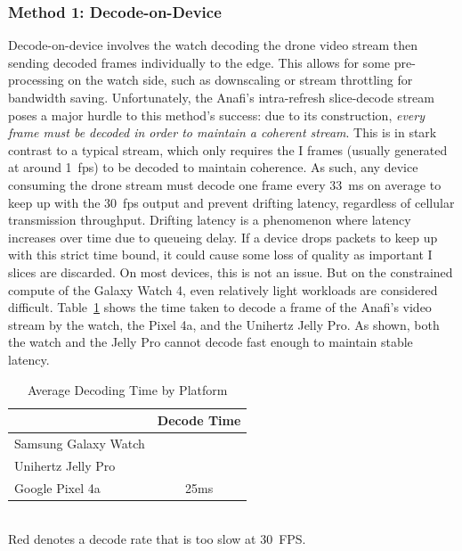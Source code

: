\subsubsection{Method 1: Decode-on-Device}
\label{sec:method-1}
Decode-on-device involves the watch decoding the drone video stream then sending decoded frames individually to the edge. This allows for some pre-processing on the watch side, such as downscaling or stream throttling for bandwidth saving. Unfortunately, the Anafi's intra-refresh slice-decode stream poses a major hurdle to this method's success: due to its construction, \textit{every frame must be decoded in order to maintain a coherent stream}. This is in stark contrast to a typical stream, which only requires the I frames (usually generated at around 1~fps) to be decoded to maintain coherence. As such, any device consuming the drone stream must decode one frame every 33~ms on average to keep up with the 30~fps output and prevent drifting latency, regardless of cellular transmission throughput. Drifting latency is a phenomenon where latency increases over time due to queueing delay. If a device drops packets to keep up with this strict time bound, it could cause some loss of quality as important I slices are discarded. On most devices, this is not an issue. But on the constrained compute of the Galaxy Watch 4, even relatively light workloads are considered difficult. Table~\ref{tab:decoding-time} shows the time taken to decode a frame of the Anafi's video stream by the watch, the Pixel 4a, and the Unihertz Jelly Pro. As shown, both the watch and the Jelly Pro cannot decode fast enough to maintain stable latency.

\begin{table}
        \centering
        \begin{tabular}{|l|c|}
                \hline
                & Decode Time \\
                \hline
                Samsung Galaxy Watch & \color{red}{55ms} \\
                Unihertz Jelly Pro & \color{red}{35ms} \\
                Google Pixel 4a & 25ms \\
                \hline
        \end{tabular}
        \begin{captext}
                \centering
                \\[0.1cm] \small \color{red}Red denotes a decode rate that is  too slow at 30~FPS.
        \end{captext}
        \caption{Average Decoding Time by Platform}
        \label{tab:decoding-time}
\end{table}


